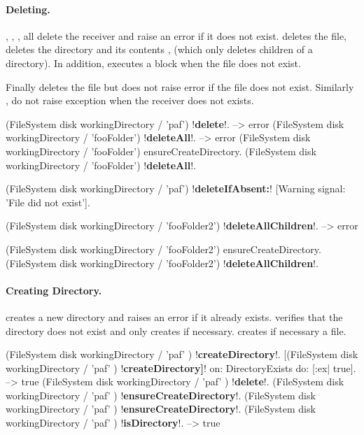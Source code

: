 \documentclass[a4paper,10pt,twoside]{book}
\begin{document}
\paragraph{Deleting.}
, , , all delete the receiver and raise an error if it does not exist. 
 deletes the file,  deletes the directory and its contents ,  (which only deletes children of a directory).  In addition,  executes a block when the file does not exist.

Finally  deletes the file but does not raise error if the file does not exist. Similarly ,  do not raise exception when the receiver does not exists. 




\begin{code}{}
(FileSystem disk workingDirectory / 'paf') !\textbf{delete}!.
  --> error
(FileSystem disk workingDirectory / 'fooFolder') !\textbf{deleteAll}!.
  --> error
(FileSystem disk workingDirectory / 'fooFolder') ensureCreateDirectory.
(FileSystem disk workingDirectory / 'fooFolder') !\textbf{deleteAll}!.

(FileSystem disk workingDirectory / 'paf') !\textbf{deleteIfAbsent:}! [Warning signal: 'File did not exist'].

(FileSystem disk workingDirectory / 'fooFolder2') !\textbf{deleteAllChildren}!.
  --> error

(FileSystem disk workingDirectory / 'fooFolder2') ensureCreateDirectory.
(FileSystem disk workingDirectory / 'fooFolder2') !\textbf{deleteAllChildren}!.
\end{code}


\paragraph{Creating Directory.}
 creates a new directory and raises an error if it already exists. 
 verifies that the directory does not exist and only creates if necessary.
 creates if necessary a file.
 
 
\begin{code}{} 
(FileSystem disk workingDirectory / 'paf' ) !\textbf{createDirectory}!.
[(FileSystem disk workingDirectory / 'paf' ) !\textbf{createDirectory]}! on: DirectoryExists do: [:ex| true].
	--> true
(FileSystem disk workingDirectory / 'paf' ) !\textbf{delete}!.
(FileSystem disk workingDirectory / 'paf' ) !\textbf{ensureCreateDirectory}!.
(FileSystem disk workingDirectory / 'paf' ) !\textbf{ensureCreateDirectory}!.
(FileSystem disk workingDirectory / 'paf' ) !\textbf{isDirectory}!.
  --> true
\end{code}
\end{document}
